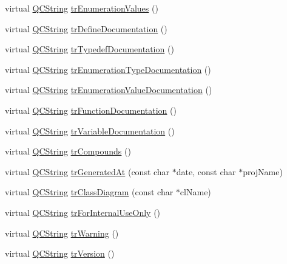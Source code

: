 \begin{DoxyCompactItemize}
\item 
virtual \hyperlink{class_q_c_string}{Q\+C\+String} \hyperlink{class_translator_persian_a24187d5344e024b056f16db59add8af2}{tr\+Enumeration\+Values} ()
\item 
virtual \hyperlink{class_q_c_string}{Q\+C\+String} \hyperlink{class_translator_persian_a87aecbc32bf74013ff13d3f18e7d7996}{tr\+Define\+Documentation} ()
\item 
virtual \hyperlink{class_q_c_string}{Q\+C\+String} \hyperlink{class_translator_persian_ae42af4bc6b62abd9053d5a272d9ef079}{tr\+Typedef\+Documentation} ()
\item 
virtual \hyperlink{class_q_c_string}{Q\+C\+String} \hyperlink{class_translator_persian_a005b6d972851319c9dac4f3e687644a7}{tr\+Enumeration\+Type\+Documentation} ()
\item 
virtual \hyperlink{class_q_c_string}{Q\+C\+String} \hyperlink{class_translator_persian_afa1fd94d571d0ac09585ddfc004c6473}{tr\+Enumeration\+Value\+Documentation} ()
\item 
virtual \hyperlink{class_q_c_string}{Q\+C\+String} \hyperlink{class_translator_persian_a0f697beb0a1f01e3ffeec7c6ba60b52a}{tr\+Function\+Documentation} ()
\item 
virtual \hyperlink{class_q_c_string}{Q\+C\+String} \hyperlink{class_translator_persian_aabf3acd2c5852f0e6e2fda6b9d05f8b5}{tr\+Variable\+Documentation} ()
\item 
virtual \hyperlink{class_q_c_string}{Q\+C\+String} \hyperlink{class_translator_persian_a2415f824b684e8411944fe033350aaa0}{tr\+Compounds} ()
\item 
virtual \hyperlink{class_q_c_string}{Q\+C\+String} \hyperlink{class_translator_persian_af50ee7f67e98c80007b093c47ad56e6e}{tr\+Generated\+At} (const char $\ast$date, const char $\ast$proj\+Name)
\item 
virtual \hyperlink{class_q_c_string}{Q\+C\+String} \hyperlink{class_translator_persian_a377a40fea9c974cd73d053226f866fb4}{tr\+Class\+Diagram} (const char $\ast$cl\+Name)
\item 
virtual \hyperlink{class_q_c_string}{Q\+C\+String} \hyperlink{class_translator_persian_a6a046e61fe1d49e488ea4abe006d178b}{tr\+For\+Internal\+Use\+Only} ()
\item 
virtual \hyperlink{class_q_c_string}{Q\+C\+String} \hyperlink{class_translator_persian_a11882019f58b798098757cd6d5b7a06b}{tr\+Warning} ()
\item 
virtual \hyperlink{class_q_c_string}{Q\+C\+String} \hyperlink{class_translator_persian_ac895454bf86458bd4d67ecf413640db4}{tr\+Version} ()

\end{DoxyCompactItemize}
